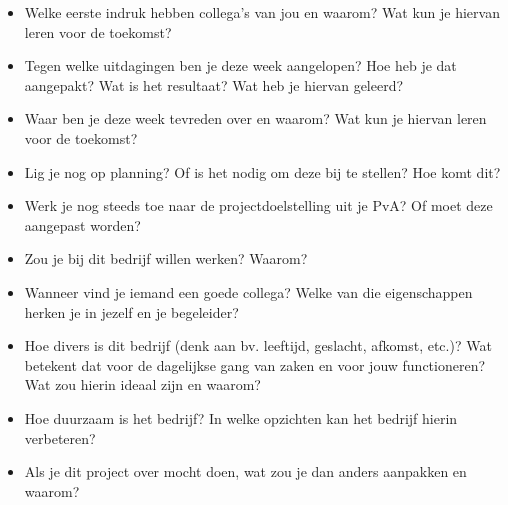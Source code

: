\documentclass[a4paper,12pt]{article}
\begin{document}
\begin{itemize}
    \item Welke eerste indruk hebben collega’s van jou en waarom? Wat kun je hiervan leren voor de toekomst?
    \item Tegen welke uitdagingen ben je deze week aangelopen? Hoe heb je dat aangepakt? Wat is het resultaat? Wat heb je hiervan geleerd?
    \item Waar ben je deze week tevreden over en waarom? Wat kun je hiervan leren voor de toekomst?
    \item Lig je nog op planning? Of is het nodig om deze bij te stellen? Hoe komt dit?
    \item Werk je nog steeds toe naar de projectdoelstelling uit je PvA? Of moet deze aangepast worden?
    \item Zou je bij dit bedrijf willen werken? Waarom?
    \item Wanneer vind je iemand een goede collega? Welke van die eigenschappen herken je in jezelf en je begeleider?
    \item Hoe divers is dit bedrijf (denk aan bv. leeftijd, geslacht, afkomst, etc.)? Wat betekent dat voor de dagelijkse gang van zaken en voor jouw functioneren? Wat zou hierin ideaal zijn en waarom?
    \item Hoe duurzaam is het bedrijf? In welke opzichten kan het bedrijf hierin verbeteren?
    \item Als je dit project over mocht doen, wat zou je dan anders aanpakken en waarom?
\end{itemize}
\end{document}
